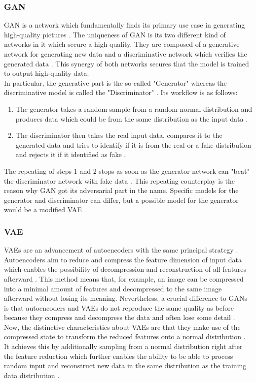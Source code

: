 \documentclass[MGS,Master,english]{twbook}%
\begin{document}
\subsubsection{\acl{GAN}}
GAN is a network which fundamentally finds its primary use case in generating high-quality pictures \cite{ml::book::developer}. The uniqueness of \ac{GAN} is its two different kind of networks in it which secure a high-quality. They are composed of a generative network for generating new data and a discriminative network which verifies the generated data \cite{ml::book::developer}. This synergy of both networks secures that the model is trained to output high-quality data. \\
In particular, the generative part is the so-called "Generator" whereas the discriminative model is called the "Discriminator" \cite{ml::book::developer}. Its workflow is as follows:
\begin{enumerate}
	\item The generator takes a random sample from a random normal distribution and produces data which could be from the same distribution as the input data \cite{ml::book::developer}.
	\item The discriminator then takes the real input data, compares it to the generated data and tries to identify if it is from the real or a fake distribution and rejects it if it identified as fake \cite{ml::book::developer}.
\end{enumerate} 
The repeating of steps 1 and 2 stops as soon as the generator network can "beat" the discriminator network with fake data \cite{ml::book::developer}. This repeating counterplay is the reason why GAN got its adversarial part in the name. Specific models for the generator and discriminator can differ, but a possible model for the generator would be a modified \ac{VAE} \cite{ml::book::nnProgrammingTF}.

\subsubsection{\acl{VAE}}
\acp{VAE} are an advancement of autoencoders with the same principal strategy \cite{ml::vae::tutorial}. Autoencoders aim to reduce and compress the feature dimension of input data which enables the possibility of decompression and reconstruction of all features afterward \cite{ml::book::nnProgrammingTF}. This method means that, for example, an image can be compressed into a minimal amount of features and decompressed to the same image afterward without losing its meaning. Nevertheless, a crucial difference to \acp{GAN} is that autoencoders and \acp{VAE} do not reproduce the same quality as before because they compress and decompress the data and often lose some detail \cite{ml::book::nnProgrammingTF}. \\
Now, the distinctive characteristics about \acp{VAE} are that they make use of the compressed state to transform the reduced features onto a normal distribution \cite{ml::vae::tutorial}. It achieves this by additionally sampling from a normal distribution right after the feature reduction which further enables the ability to be able to process random input and reconstruct new data in the same distribution as the training data distribution \cite{ml::vae::tutorial}.
\end{document}
